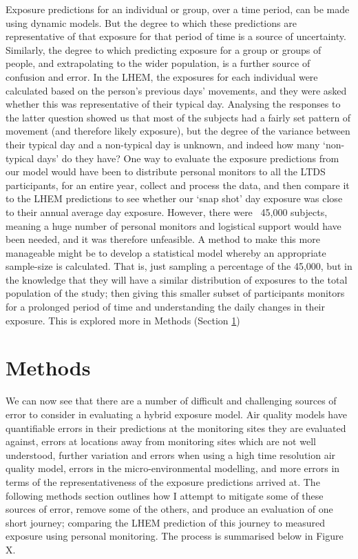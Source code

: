 Exposure predictions for an individual or group, over a time period, can be made using dynamic models. But the degree to which these predictions are representative of that exposure for that period of time is a source of uncertainty. Similarly, the degree to which predicting exposure for a group or groups of people, and extrapolating to the wider population, is a further source of confusion and error. In the LHEM, the exposures for each individual were calculated based on the person’s previous days’ movements, and they were asked whether this was representative of their typical day. Analysing the responses to the latter question showed us that most of the subjects had a fairly set pattern of movement (and therefore likely exposure), but the degree of the variance between their typical day and a non-typical day is unknown, and indeed how many ‘non-typical days’ do they have? One way to evaluate the exposure predictions from our model would have been to distribute personal monitors to all the LTDS participants, for an entire year, collect and process the data, and then compare it to the LHEM predictions to see whether our ‘snap shot’ day exposure was close to their annual average day exposure. However, there were ~45,000 subjects, meaning a huge number of personal monitors and logistical support would have been needed, and it was therefore unfeasible. A method to make this more manageable might be to develop a statistical model whereby an appropriate sample-size is calculated. That is, just sampling a percentage of the 45,000, but in the knowledge that they will have a similar distribution of exposures to the total population of the study; then giving this smaller subset of participants monitors for a prolonged period of time and understanding the daily changes in their exposure. This is explored more in Methods (Section \ref{sec:4methods}) 

\section{Methods}
\label{sec:4methods}

We can now see that there are a number of difficult and challenging sources of error to consider in evaluating a hybrid exposure model. Air quality models have quantifiable errors in their predictions at the monitoring sites they are evaluated against, errors at locations away from monitoring sites which are not well understood, further variation and errors when using a high time resolution air quality model, errors in the micro-environmental modelling, and more errors in terms of the representativeness of the exposure predictions arrived at. The following methods section outlines how I attempt to mitigate some of these sources of error, remove some of the others, and produce an evaluation of one short journey; comparing the LHEM prediction of this journey to measured exposure using personal monitoring. The process is summarised below in Figure X.

